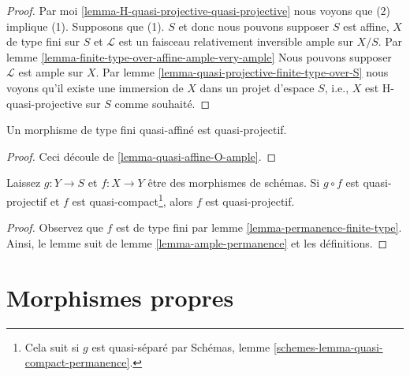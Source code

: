 \begin{proof}

Par moi \ref{lemma-H-quasi-projective-quasi-projective}
nous voyons que (2) implique (1). Supposons que (1). $S$ et donc nous pouvons supposer $S$ est affine,
$X$ de type fini sur $S$ et
$\mathcal{L}$ est un faisceau relativement inversible ample sur $X/S$. Par lemme \ref{lemma-finite-type-over-affine-ample-very-ample}
Nous pouvons supposer $\mathcal{L}$ est ample sur $X$. Par lemme \ref{lemma-quasi-projective-finite-type-over-S} nous voyons qu'il existe une immersion de $X$ dans un projet d'espace $S$, i.e., $X$ est H-quasi-projective sur $S$
comme souhaité.

\end{proof}

\begin{lemma}

\label{lemma-quasi-affine-finite-type-quasi-projective}

\begin{reference}

\cite[II, proposition 5.3.4 i)]{EGA}

\end{reference}

Un morphisme de type fini quasi-affiné est quasi-projectif.

\end{lemma}

\begin{proof}
Ceci découle de \ref{lemma-quasi-affine-O-ample}.
\end{proof}

\begin{lemma}

\label{lemma-quasi-projective-permanence}
Laissez $g : Y \to S$ et $f : X \to Y$ être des morphismes de schémas. Si $g \circ f$ est quasi-projectif et $f$ est quasi-compact\footnote{Cela suit si $g$ est quasi-séparé par Schémas, lemme \ref{schemes-lemma-quasi-compact-permanence}.}, alors $f$ est quasi-projectif.
\end{lemma}

\begin{proof}
Observez que $f$ est de type fini par lemme \ref{lemma-permanence-finite-type}. Ainsi, le lemme suit de lemme \ref{lemma-ample-permanence} et les définitions.
\end{proof}





\section{Morphismes propres}
\label{section-proper}

